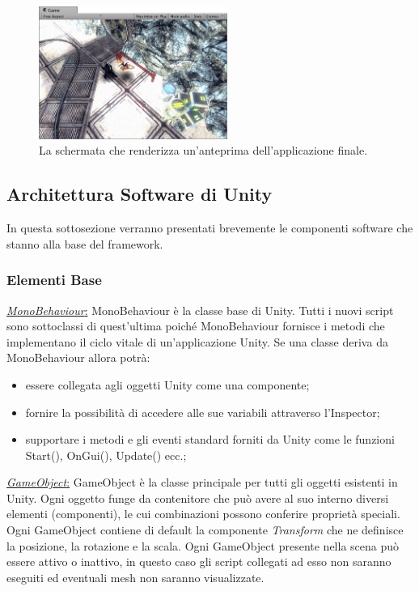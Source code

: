 \begin{figure}[H]
	\includegraphics[width=0.55\textwidth]{figure/GameView}
	\centering
	\caption{La schermata che renderizza un'anteprima dell'applicazione finale.}
\end{figure}

\newpage
	

\subsection{Architettura Software di Unity}

In questa sottosezione verranno presentati brevemente le componenti software che stanno alla base del framework.

\subsubsection{Elementi Base}



\begin{flushleft}
	\underline{\textit{MonoBehaviour}:}
	MonoBehaviour è la classe base di Unity. Tutti i nuovi script sono sottoclassi di quest'ultima poiché MonoBehaviour fornisce i metodi che implementano il ciclo vitale di un'applicazione Unity.
	Se una classe deriva da MonoBehaviour allora potrà:
	 \begin{itemize}
	 	\item essere collegata agli oggetti Unity come una componente;
	 	\item fornire la possibilità di accedere alle sue variabili attraverso l'Inspector;
	 	\item supportare i metodi e gli eventi standard forniti da Unity come le funzioni Start(), OnGui(), Update() ecc.;
	 \end{itemize}
\end{flushleft}

\begin{flushleft}
\underline{\textit{GameObject}:}
GameObject è la classe principale per tutti gli oggetti esistenti in Unity. Ogni oggetto funge da contenitore che può avere al suo interno diversi elementi (componenti), le cui combinazioni possono conferire proprietà speciali. Ogni GameObject contiene di default la componente \textit{Transform} che ne definisce la posizione, la rotazione e la scala. Ogni GameObject presente nella scena può essere attivo o inattivo, in questo caso gli script collegati ad esso non saranno eseguiti ed eventuali mesh non saranno visualizzate.
\end{flushleft}

